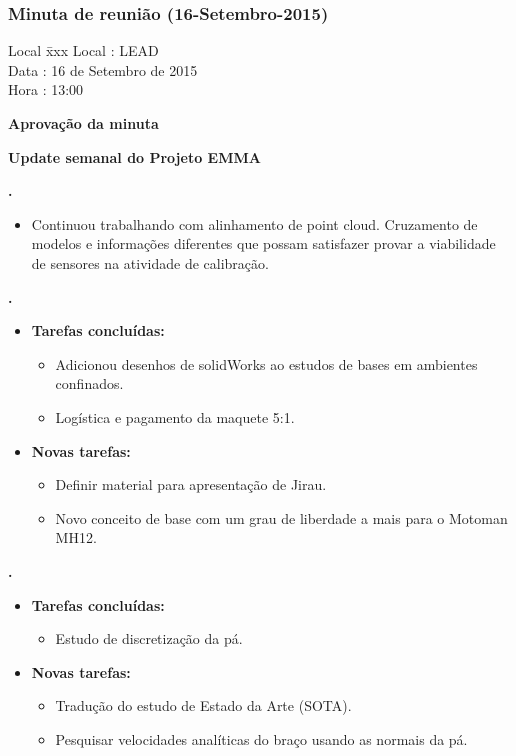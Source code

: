 \subsubsection{Minuta de reunião (16-Setembro-2015)}

\begin{tabbing}
  Local \= xxx \kill
  Local \> : LEAD \\
  Data  \> : 16 de Setembro de 2015 \\
  Hora  \> : 13:00
\end{tabbing}


\textbf{Aprovação da minuta}

\textbf{Update semanal do Projeto EMMA}
   							
							
\textbf{\gabriel.} 
	\begin{itemize}
			\item Continuou trabalhando com alinhamento de point cloud. Cruzamento de
			modelos e informações diferentes que possam satisfazer provar a viabilidade de sensores na atividade de calibração.
			\end{itemize}
					
			
   \textbf{.} 
	\begin{itemize}
		\item \textbf{Tarefas concluídas:}
			\begin{itemize}  
			  \item Adicionou desenhos de solidWorks ao estudos de bases em ambientes
			  confinados.
			  \item Logística e pagamento da maquete 5:1.
			\end{itemize}
		
		\item \textbf{Novas tarefas:}
			\begin{itemize} 
				\item Definir material para apresentação de Jirau.
				\item Novo conceito de base com um grau de liberdade a mais para o Motoman
				MH12.
			\end{itemize}
	\end{itemize}

	  \textbf{\renan.} 
	\begin{itemize}
		\item \textbf{Tarefas concluídas:}
			\begin{itemize}    
				\item Estudo de discretização da pá.
			\end{itemize}
		
		\item \textbf{Novas tarefas:}
			\begin{itemize} 
			    \item Tradução do estudo de Estado da Arte (SOTA).
			    \item Pesquisar velocidades analíticas do braço usando as normais da pá.
			\end{itemize}
	\end{itemize}	
	
